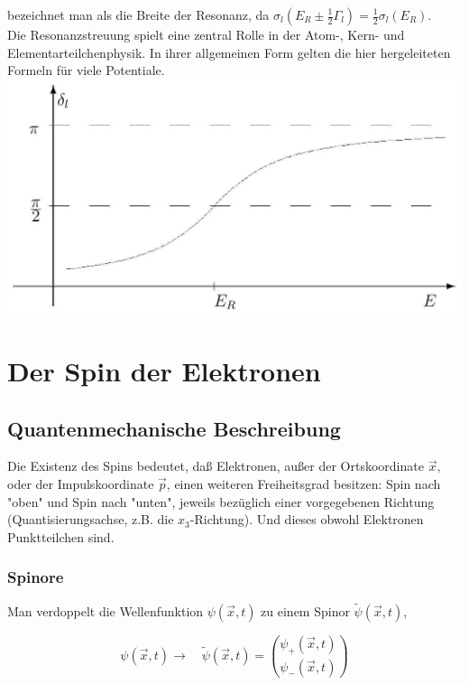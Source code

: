 \documentclass[10pt, letterpaper]{article}
\begin{document}
bezeichnet man als die Breite der Resonanz, da $\sigma_{l}\left(E_{R} \pm \frac{1}{2} \Gamma_{l}\right)=\frac{1}{2} \sigma_{l}\left(E_{R}\right)$.\\
Die Resonanzstreuung spielt eine zentral Rolle in der Atom-, Kern- und Elementarteilchenphysik. In ihrer allgemeinen Form gelten die hier hergeleiteten Formeln für viele Potentiale.\\
\includegraphics[scale=0.2, center]{2025_05_21_d5590f158a899e385c7cg-22}









\pagebreak

\section{Der Spin der Elektronen}


\subsection*{Quantenmechanische Beschreibung}
Die Existenz des Spins bedeutet, daß Elektronen, außer der Ortskoordinate $\vec{x}$, oder der Impulskoordinate $\vec{p}$, einen weiteren Freiheitsgrad besitzen: Spin nach "oben" und Spin nach "unten", jeweils bezüglich einer vorgegebenen Richtung (Quantisierungsachse, z.B. die $x_{3}$-Richtung). Und dieses obwohl Elektronen Punktteilchen sind.

\subsubsection*{Spinore}
Man verdoppelt die Wellenfunktion $\psi(\vec{x}, t)$ zu einem Spinor $\tilde{\psi}(\vec{x}, t)$,

$$
\psi(\vec{x}, t) \rightarrow \quad \tilde{\psi}(\vec{x}, t)=\binom{\psi_{+}(\vec{x}, t)}{\psi_{-}(\vec{x}, t)}
$$
\end{document}
